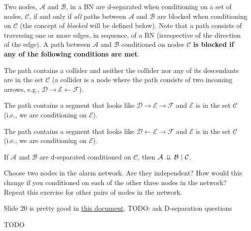 \documentclass{tufte-handout}
\begin{document}
\begin{recall}
Two nodes, $\mathcal{A}$ and $\mathcal{B}$, in a BN are d-separated when conditioning on a set of nodes, $\mathcal{C}$, if and only if \emph{all} paths between  $\mathcal{A}$ and $\mathcal{B}$ are blocked when conditioning on $\mathcal{C}$ (the concept of \emph{blocked} will be defined below).  Note that a path consists of traversing one or more edges, in sequence, of a BN (irrespective of the direction of the edge).  A path between $\mathcal{A}$ and $\mathcal{B}$ conditioned on nodes $\mathcal{C}$ \textbf{is blocked if any of the following conditions are met}.
\be
\item The path contains a collider and neither the collider nor any of its descendants are in the set $\mathcal{C}$ (a collider is a node where the path consists of two incoming arrows, e.g., $\mathcal{D} \rightarrow \mathcal{E} \leftarrow \mathcal{F}$).
\item The path contains a segment that looks like $\mathcal{D} \rightarrow \mathcal{E} \rightarrow \mathcal{F}$ and $\mathcal{E}$ is in the set $\mathcal{C}$ (i.e., we are conditioning on $\mathcal{E}$).
\item The path contains a segment that looks like $\mathcal{D} \leftarrow \mathcal{E} \rightarrow \mathcal{F}$ and $\mathcal{E}$ is in the set $\mathcal{C}$ (i.e., we are conditioning on $\mathcal{E}$).
\ee


\vspace{1em}
\noindent If $\mathcal{A}$ and $\mathcal{B}$ are d-separated conditioned on $\mathcal{C}$, then $\mathcal{A} \perp\!\!\!\perp \mathcal{B}~|~\mathcal{C}$.

\end{recall}

\begin{exercise}
Choose two nodes in the alarm network.  Are they independent?  How would this change if you conditioned on each of the other three nodes in the network?  Repeat this exercise for other pairs of nodes in the network.
\end{exercise}


\begin{exercise}
Slide 20 is pretty good in \href{http://idm-lab.org/intro-to-ai/slides/Bayesian\_Networks.pdf}{this document}.
TODO: ask D-separation questions
\begin{boxedsolution}
TODO
\end{boxedsolution}
\end{exercise}
\end{document}
